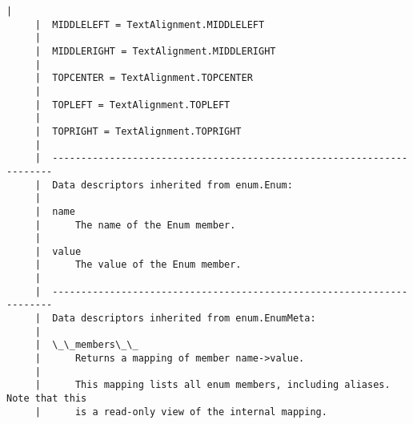 \documentclass[11pt]{article}
\begin{document}
\begin{Verbatim}[commandchars=\\\{\}]
     |  
     |  MIDDLELEFT = TextAlignment.MIDDLELEFT
     |  
     |  MIDDLERIGHT = TextAlignment.MIDDLERIGHT
     |  
     |  TOPCENTER = TextAlignment.TOPCENTER
     |  
     |  TOPLEFT = TextAlignment.TOPLEFT
     |  
     |  TOPRIGHT = TextAlignment.TOPRIGHT
     |  
     |  ----------------------------------------------------------------------
     |  Data descriptors inherited from enum.Enum:
     |  
     |  name
     |      The name of the Enum member.
     |  
     |  value
     |      The value of the Enum member.
     |  
     |  ----------------------------------------------------------------------
     |  Data descriptors inherited from enum.EnumMeta:
     |  
     |  \_\_members\_\_
     |      Returns a mapping of member name->value.
     |      
     |      This mapping lists all enum members, including aliases. Note that this
     |      is a read-only view of the internal mapping.
    

\end{Verbatim}
\end{document}
